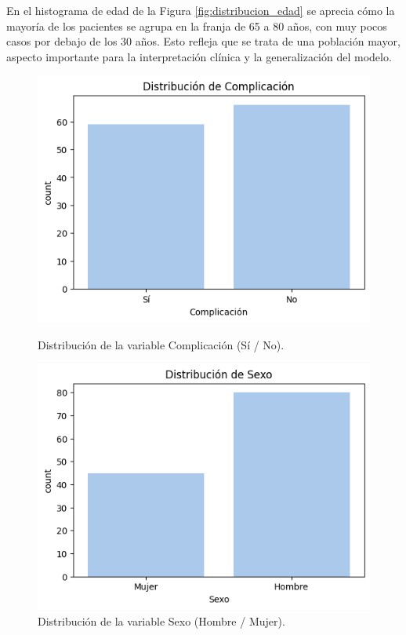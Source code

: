 En el histograma de edad de la Figura \ref{fig:distribucion_edad} se aprecia cómo la mayoría de los pacientes se agrupa en la franja de 65 a 80 años, con muy pocos casos por debajo de los 30 años. Esto refleja que se trata de una población mayor, aspecto importante para la interpretación clínica y la generalización del modelo.


\begin{figure}[!htbp]
    \centering
    \begin{minipage}[b]{0.45\textwidth}
        \centering
        \includegraphics[width=\textwidth]{img/histograma_dist_complicacion.png}
        \caption{Distribución de la variable Complicación (Sí / No).}
        \label{fig:distribucion_complicacion}
    \end{minipage}
    \hspace{0.05\textwidth}
    \begin{minipage}[b]{0.45\textwidth}
        \centering
        \includegraphics[width=\textwidth]{img/histograma_dist_sexo.png}
        \caption{Distribución de la variable Sexo (Hombre / Mujer).}
        \label{fig:distribucion_sexo}
    \end{minipage}
\end{figure}

